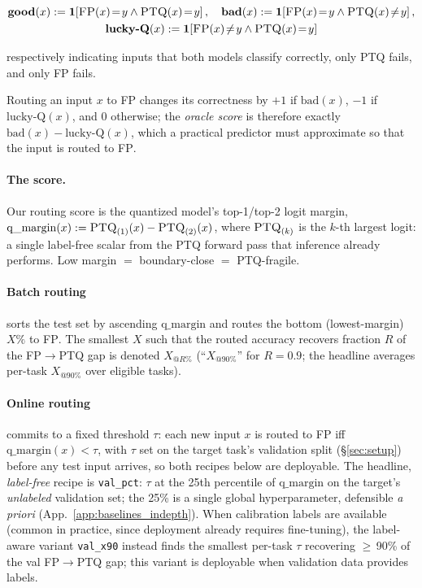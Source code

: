\documentclass{article}
\makeatletter
\newcommand{\fp}{\textsc{FP}\xspace}
\newcommand{\ptq}{\textsc{PTQ}\xspace}
\newcommand{\xat}[1]{\ensuremath{X_{@#1\%}}}
\makeatother
\begin{document}
\[
\begin{gathered}
  \textbf{good}(x) := \mathbf{1}\!\left[\fp(x)\!=\!y \wedge \ptq(x)\!=\!y\right], \quad
  \textbf{bad}(x)  := \mathbf{1}\!\left[\fp(x)\!=\!y \wedge \ptq(x)\!\neq\!y\right],\\
  \textbf{lucky-Q}(x) := \mathbf{1}\!\left[\fp(x)\!\neq\!y \wedge \ptq(x)\!=\!y\right]
\end{gathered}
\]

respectively indicating inputs that both models classify correctly, only \ptq fails, and only \fp fails. 


Routing an input \(x\) to \fp{} changes its correctness by \(+1\) if \(\text{bad}(x)\), \(-1\) if \(\text{lucky-Q}(x)\), and 0 otherwise; the \emph{oracle score} is therefore exactly \(\text{bad}(x)-\text{lucky-Q}(x)\), which a practical predictor must approximate so that the input is routed to \fp.

\paragraph{The score.}\label{sec:routing_recipe}
Our routing score is the quantized model's top-1/top-2 logit margin, $\mathrm{q\_margin}(x) := \ptq_{(1)}(x) - \ptq_{(2)}(x)$, where $\ptq_{(k)}$ is the $k$-th largest logit: a single label-free scalar from the \ptq{} forward pass that inference already performs. Low margin $=$ boundary-close $=$ PTQ-fragile.

\paragraph{Batch routing} sorts the test set by ascending $\mathrm{q\_margin}$ and routes the bottom (lowest-margin) $X\%$ to \fp{}. The smallest $X$ such that the routed accuracy recovers fraction $R$ of the \fp$\to$\ptq{} gap is denoted \xat{R} (``\xat{90}'' for $R\!=\!0.9$; the headline averages per-task \xat{90} over eligible tasks).

\paragraph{Online routing} commits to a fixed threshold $\tau$: each new input $x$ is routed to \fp{} iff $\mathrm{q\_margin}(x) < \tau$, with $\tau$ set on the target task's validation split (\S\ref{sec:setup}) before any test input arrives, so both recipes below are deployable. The headline, \emph{label-free} recipe is \texttt{val\_pct}: $\tau$ at the 25th percentile of $\mathrm{q\_margin}$ on the target's \emph{unlabeled} validation set; the 25\% is a single global hyperparameter, defensible \emph{a priori} (App.~\ref{app:baselines_indepth}). When calibration labels are available (common in practice, since deployment already requires fine-tuning), the label-aware variant \texttt{val\_x90} instead finds the smallest per-task $\tau$ recovering $\geq$\,90\% of the val \fp$\to$\ptq{} gap; this variant is deployable when validation data provides labels.
\end{document}

